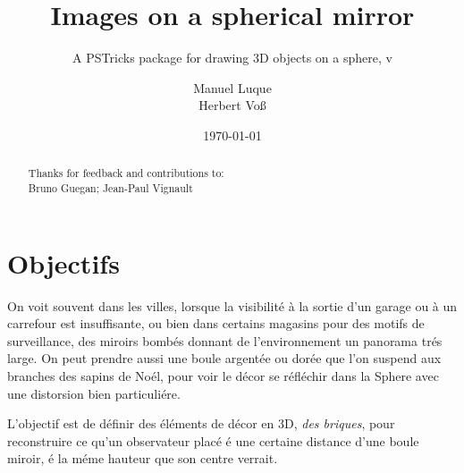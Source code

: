 \documentclass[11pt,frenchb,BCOR10mm,DIV12,bibliography=totoc,parskip=false,smallheadings
    headexclude,footexclude,oneside]{pst-doc}
\let\myFV\fileversion
\begin{document}
\author{Manuel Luque\\Herbert Vo\ss}
\docauthor{}
\date{\today}
\title{Images on a spherical mirror}
\subtitle{A PSTricks package for drawing 3D objects on a sphere,  v\myFV}
\maketitle%

\tableofcontents

\clearpage
\begin{abstract}

\vfill\noindent
Thanks for feedback and contributions to:\\
Bruno Guegan; Jean-Paul Vignault
\end{abstract}


\section{Objectifs }
On voit souvent dans les villes, lorsque la visibilité à la sortie
d'un garage ou à un carrefour est insuffisante, ou bien
dans certains magasins pour des motifs de surveillance, des
miroirs bombés donnant de l'environnement un panorama trés large.
On peut prendre aussi une boule argentée ou dorée que l'on suspend
aux branches des sapins de Noél, pour voir le décor se réfléchir dans la Sphere
avec une distorsion bien particuliére.

L'objectif est de définir des éléments de décor en 3D, \textit{des
briques}, pour reconstruire ce qu'un observateur placé é une
certaine distance d'une boule miroir, é la méme hauteur que son
centre verrait.
\end{document}
